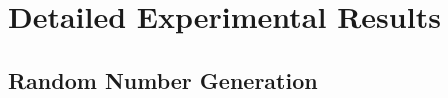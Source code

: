 \section{Detailed Experimental Results}\label{appendix:exp_results}



\clearpage


\newpage


\newpage



\newpage
\subsection{Random Number Generation}\label{sec:random_number_generation}
